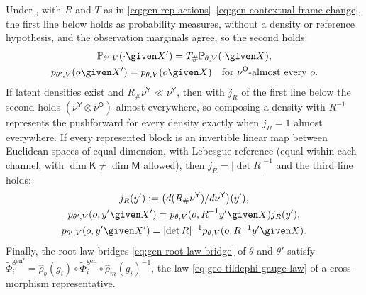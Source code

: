 Under , with $R$ and $T$ as in
\eqref{eq:gen-rep-actions}--\eqref{eq:gen-contextual-frame-change}, the first line below holds as
probability measures, without a density or reference hypothesis, and the observation marginals agree, so
the second holds:
\begin{gather}
\mathbb P_{\theta',V}(\cdot\given X')=T_\#\mathbb P_{\theta,V}(\cdot\given X),
\label{eq:gen-gauge-joint-pushforward}\\
p_{\theta',V}(o\given X')=p_{\theta,V}(o\given X)
\quad\text{for }\nu^{\mathsf O}\text{-almost every }o.
\label{eq:gen-gauge-evidence-invariance}
\end{gather}
If latent densities exist and $R_\#\nu^{\mathsf Y}\ll\nu^{\mathsf Y}$, then with $j_R$ of the first line
below the second holds $(\nu^{\mathsf Y}\otimes\nu^{\mathsf O})$-almost everywhere, so composing a density
with $R^{-1}$ represents the pushforward for every density exactly when $j_R=1$ almost everywhere. If every
represented block is an invertible linear map between Euclidean spaces of equal dimension, with Lebesgue
reference (equal within each channel, with $\dim\mathsf K\neq\dim\mathsf M$ allowed), then
$j_R=\lvert\det R\rvert^{-1}$ and the third line holds:
\begin{gather}
j_R(y'):=\bigl(d(R_\#\nu^{\mathsf Y})/d\nu^{\mathsf Y}\bigr)(y'),
\label{eq:gen-gauge-reference-rn}\\
p_{\theta',V}(o,y'\given X')=p_{\theta,V}(o,R^{-1}y'\given X)j_R(y'),
\label{eq:gen-gauge-rn-density}\\
p_{\theta',V}(o,y'\given X')=\lvert\det R\rvert^{-1}p_{\theta,V}(o,R^{-1}y'\given X).
\label{eq:gen-gauge-lebesgue-density}
\end{gather}
Finally, the root law bridges \eqref{eq:gen-root-law-bridge} of $\theta$ and $\theta'$ satisfy
$\widetilde\Phi^{\mathrm{gen}\prime}_i=\widehat\rho_b(g_i)\circ\widetilde\Phi^{\mathrm{gen}}_i\circ\widehat\rho_m(g_i)^{-1}$,
the law \eqref{eq:geo-tildephi-gauge-law} of a cross-morphism representative. 

